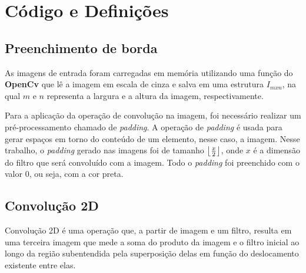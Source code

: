 \documentclass[twoside,twocolumn]{article}
\DeclarePairedDelimiter\floor{\lfloor}{\rfloor}
\begin{document}

\section{Código e Definições}

\subsection{Preenchimento de borda}

As imagens de entrada foram carregadas em memória utilizando uma função do \textbf{OpenCv} \cite{b1} que lê a imagem em escala de cinza e salva em uma estrutura $I_{m x n}$, na qual $m$ e $n$ representa a largura e a altura da imagem, respectivamente.

Para a aplicação da operação de convolução na imagem, foi necessário realizar um pré-processamento chamado de \textit{padding}. A operação de \textit{padding} é usada para gerar espaços em torno do conteúdo de um elemento, nesse caso, a imagem. Nesse trabalho, o \textit{padding} gerado nas imagens foi de tamanho $\floor*{\frac{x}{2}}$, onde $x$ é a dimensão do filtro que será convoluído com a imagem. Todo o \textit{padding} foi preenchido com o valor $0$, ou seja, com a cor preta.

\subsection{Convolução 2D}

Convolução 2D é uma operação que, a partir de imagem e um filtro, resulta em uma terceira imagem que mede a soma do produto da imagem e o filtro inicial ao longo da região subentendida pela superposição delas em função do deslocamento existente entre elas.
\end{document}

